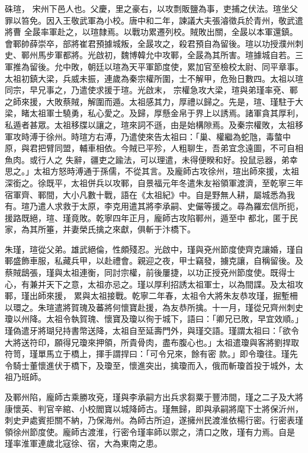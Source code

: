 
\begin{pinyinscope}

 硃瑄，
 宋州下邑人也。父慶，里之豪右，以攻剽販鹽為事，吏捕之伏法。瑄坐父罪以笞免。因入王敬武軍為小校。唐中和二年，諫議大夫張濬徵兵於青州，敬武遣將曹
 全晸率軍赴之，以瑄隸焉。以戰功累遷列校。賊敗出關，全晸以本軍還鎮。會鄆帥薛崇卒，部將崔君預據城叛，全晸攻之，殺君預自為留後。瑄以功授濮州刺史、鄆州馬步軍都將。光啟初，魏博韓允中攻鄆，全晸為其所害。瑄據城自若。三軍推為留後。允中敗，朝廷以瑄為天平軍節度使，累加官至檢校太尉、同平章事。太祖初鎮大梁，兵威未振，連歲為秦宗權所圍，士不解甲，危殆日數四。太祖以瑄同宗，早兄事之，乃遣使求援于瑄。光啟末，
 宗權急攻大梁，瑄與弟瑾率兗、鄆之師來援，大敗蔡賊，解圍而遁。太祖感其力，厚禮以歸之。先是，瑄、瑾駐于大梁，睹太祖軍士驍勇，私心愛之。及歸，厚懸金帛于界上以誘焉。諸軍貪其厚利，私遁者甚眾。太祖移牒以讓之，瑄來詞不遜，由是始構隙焉。及秦宗權敗，太祖移軍攻時溥于徐州。時瑄方右溥，乃遣使來告太祖曰：「巢、權繼為蛇虺，毒螫中原，與君把臂同盟，輔車相依。今賊已平殄，人粗聊生，吾弟宜念遠圖，不可自相魚肉。或行人之
 失辭，疆吏之踰法，可以理遣，未得便睽和好。投鼠忌器，弟幸思之。」太祖方怒時溥通于孫儒，不從其言。及龐師古攻徐州，瑄出師來援，太祖深銜之。徐既平，太祖併兵以攻鄆，自景福元年冬遣朱友裕領軍渡濟，至乾寧三年宿軍齊、鄆間，大小凡數十戰，語在《太祖紀》中。自是野無人耕，屬城悉為我有。瑄乃遣人求救于太原，李克用遣其將李承嗣、史儼等援之。尋為羅宏信所扼，援路既絕，瑄、瑾竟敗。乾寧四年正月，龐師古攻陷鄆州，遁至中
 都北，匿于民家，為其所箠，并妻榮氏擒之來獻，俱斬于汴橋下。



 朱瑾，瑄從父弟。雄武絕倫，性頗殘忍。光啟中，瑾與兗州節度使齊克讓婚，瑾自鄆盛飾車服，私藏兵甲，以赴禮會。親迎之夜，甲士竊發，擄克讓，自稱留後。及蔡賊鴟張，瑾與太祖連衡，同討宗權，前後屢捷，以功正授兗州節度使。既得士心，有兼并天下之意，太祖亦忌之。瑾以厚利招誘太祖軍士，以為間諜。及太祖攻鄆，瑾出師來援，
 累與太祖接戰。乾寧二年春，太祖令大將朱友恭攻瑾，掘塹柵以環之。朱瑄遣將賀瑰及蕃將何懷寶赴援，為友恭所擒。十一月，瑾從兄齊州刺史瓊以州降。太祖令執賀瑰、懷寶及瓊以徇于城下，語曰：「卿兄已敗，早宜效順。」瑾偽遣牙將瑚兒持書幣送降，太祖自至延壽門外，與瑾交語。瑾謂太祖曰：「欲令大將送符印，願得兄瓊來押領，所貴骨肉，盡布腹心也。」太祖遣瓊與客將劉捍取符笥，瑾單馬立于橋上，揮手謂捍曰：「可令兄來，餘有密
 款。」即令瓊往。瑾先令騎士董懷進伏于橋下，及瓊至，懷進突出，擒瓊而入，俄而斬瓊首投于城外，太祖乃班師。



 及鄆州陷，龐師古乘勝攻兗，瑾與李承嗣方出兵求芻粟于豐沛間，瑾之二子及大將康懷英、判官辛綰、小校閻寶以城降師古。瑾無歸，即與承嗣將麾下士將保沂州，刺史尹處賓拒關不納，乃保海州。為師古所迫，遂擁州民渡淮依楊行密。行密表瑾領徐州節度使。龐師古渡淮，行密令瑾率師以禦之，清口之敗，瑾有力焉。自是
 瑾率淮軍連歲北寇徐、宿，大為東南之患。



\end{pinyinscope}
